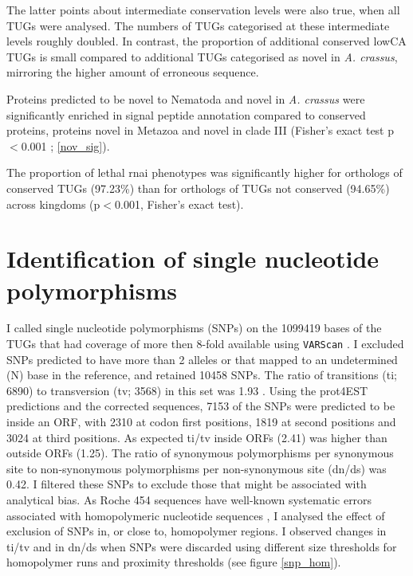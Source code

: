 The latter points about intermediate conservation levels were also
true, when all TUGs were analysed. The numbers of TUGs categorised at
these intermediate levels roughly doubled. In contrast, the proportion
of additional conserved lowCA TUGs is small compared to additional
TUGs categorised as novel in \textit{A. crassus}, mirroring the higher
amount of erroneous sequence.

Proteins predicted to be novel to Nematoda and novel in
\textit{A. crassus} were significantly enriched in signal peptide
annotation compared to conserved proteins, proteins novel in Metazoa
and novel in clade III (Fisher's exact test p$<$0.001 ;
\ref{nov_sig}).


The proportion of lethal rnai phenotypes was significantly higher for
orthologs of conserved TUGs (97.23\%) than for orthologs of TUGs not
conserved (94.65\%) across kingdoms (p$<$0.001, Fisher's exact test).

\section{Identification of single nucleotide polymorphisms}

I called single nucleotide polymorphisms (SNPs) on the 1099419 bases
of the TUGs that had coverage of more then 8-fold available using
\texttt{VARScan} \cite{pmid19542151}. I excluded SNPs predicted to
have more than 2 alleles or that mapped to an undetermined (N) base in
the reference, and retained 10458 SNPs. The ratio of transitions (ti;
6890) to transversion (tv; 3568) in this set was 1.93 . Using the
prot4EST predictions and the corrected sequences, 7153 of the SNPs
were predicted to be inside an ORF, with 2310 at codon first
positions, 1819 at second positions and 3024 at third positions. As
expected ti/tv inside ORFs (2.41) was higher than outside ORFs
(1.25). The ratio of synonymous polymorphisms per synonymous site to
non-synonymous polymorphisms per non-synonymous site (dn/ds) was
0.42. I filtered these SNPs to exclude those that might be associated
with analytical bias. As Roche 454 sequences have well-known
systematic errors associated with homopolymeric nucleotide sequences
\cite{pmid21685085}, I analysed the effect of exclusion of SNPs in,
or close to, homopolymer regions. I observed changes in ti/tv and in
dn/ds when SNPs were discarded using different size thresholds for
homopolymer runs and proximity thresholds (see figure \ref{snp_hom}).

